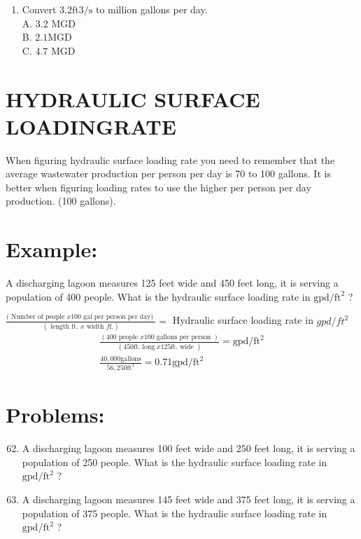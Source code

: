 \begin{enumerate}
\begin{enumerate}
  \item Convert $3.2 \mathrm{ft} 3 / \mathrm{s}$ to million gallons per day.\\
A. 3.2 MGD\\
B. $2.1 \mathrm{MGD}$\\
C. 4.7 MGD

\end{enumerate}
\section{HYDRAULIC SURFACE LOADINGRATE}
When figuring hydraulic surface loading rate you need to remember that the average wastewater production per person per day is 70 to 100 gallons. It is better when figuring loading rates to use the higher per person per day production. (100 gallons).

\section{Example:}
A discharging lagoon measures 125 feet wide and 450 feet long, it is serving a population of 400 people. What is the hydraulic surface loading rate in $\mathrm{gpd} / \mathrm{ft}^{2}$ ?

$\frac{(\text { Number of people } x 100 \text { gal per person per day) }}{(\text { length ft. } x \text { width } f \mathrm{f} .)}=$ Hydraulic surface loading rate in $g p d / f t^{2}$
$$
\begin{gathered}
\frac{(400 \text { people } x 100 \text { gallons per person })}{(450 \mathrm{ft} . \operatorname{long} x 125 \mathrm{ft} . \text { wide })}=\mathrm{gpd} / \mathrm{ft}^{2} \\
\frac{40,000 \mathrm{gallons}}{56,250 \mathrm{ft}^{2}}=0.71 \mathrm{gpd} / \mathrm{ft}^{2}
\end{gathered}
$$

\section{Problems:}
\begin{enumerate}
  \setcounter{enumi}{61}
  \item A discharging lagoon measures 100 feet wide and 250 feet long, it is serving a population of 250 people. What is the hydraulic surface loading rate in $\mathrm{gpd} / \mathrm{ft}^{2}$ ?

  \item A discharging lagoon measures 145 feet wide and 375 feet long, it is serving a population of 375 people. What is the hydraulic surface loading rate in $\mathrm{gpd} / \mathrm{ft}^{2}$ ?


\end{enumerate}
\end{enumerate}
